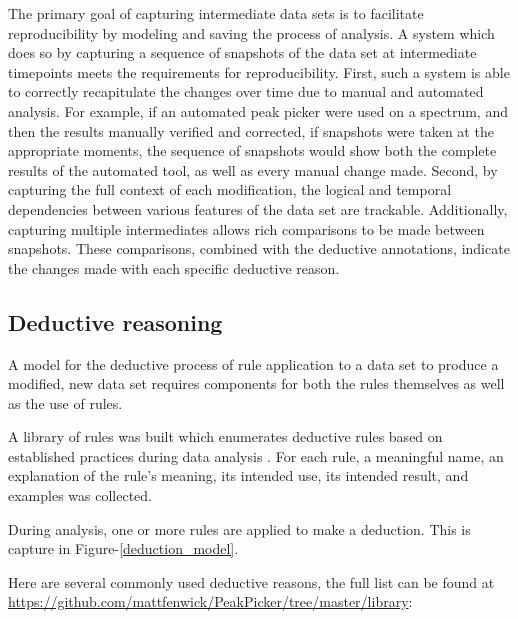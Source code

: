 The primary goal of capturing intermediate data sets is to 
facilitate reproducibility by modeling and saving the process of analysis.  
A system which does so by capturing a sequence of snapshots of the data set 
at intermediate timepoints meets the requirements for reproducibility.
First, such a system is able to correctly recapitulate the changes over time
due to manual and automated analysis.  For example,
if an automated peak picker were used on a spectrum, and then the results
manually verified and corrected, if snapshots were taken at the appropriate
moments, the sequence of snapshots would show both the complete results of
the automated tool, as well as every manual change made.
Second, by capturing the full context of each modification, the logical and 
temporal dependencies between various features of the data set are trackable.
Additionally, capturing multiple intermediates allows rich comparisons to be made 
between snapshots.  These comparisons, combined with the deductive annotations,
indicate the changes made with each specific deductive reason. 


\subsection{Deductive reasoning}
A model for the deductive process of rule application to a data set to 
produce a modified, new data set requires components for both the rules 
themselves as well as the use of rules.  

A library of rules was built which enumerates deductive rules based on 
established practices during data analysis \cite{guerry2011automated, hncacb,
hnco, cbcaconh, hbhaconh, picky, xeasy, sparky, ccpn}.  For each rule, 
a meaningful name, an explanation of the rule's meaning, its intended use,
its intended result, and examples was collected.

During analysis, one or more rules are applied to make a deduction.  This
is capture in Figure-\ref{deduction_model}.


Here are several commonly used deductive reasons, the full list can be found
at \url{https://github.com/mattfenwick/PeakPicker/tree/master/library}:

